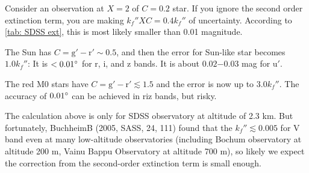 

\begin{ex}
Consider an observation at $ X = 2 $ of $ C = 0.2 $ star. If you ignore the second order extinction term, you are making $ k_f'' XC = 0.4 k_f'' $ of uncertainty. According to \cref{tab: SDSS ext}, this is most likely smaller than 0.01 magnitude. 

The Sun has $ C = \mathrm{g' - r'} \sim 0.5 $, and then the error for Sun-like star becomes $ 1.0 k_f'' $: It is $ < \m{0.01} $ for r, i, and z bands. It is about $ 0.02\mathrm{-}0.03 $ mag for $ \mathrm{u}' $.

The red M0 stars have $ C = \mathrm{g' - r'} \lesssim 1.5 $ and the error is now up to $ 3.0 k_f'' $. The accuracy of $ \m{0.01} $ can be achieved in riz bands, but risky.
\end{ex}

The calculation above is only for SDSS observatory at altitude of 2.3 km. But fortunately, BuchheimB (2005, SASS, 24, 111) found that the $ k_f'' \lesssim 0.005 $ for V band even at many low-altitude observatories (including Bochum observatory at altitude 200 m, Vainu Bappu Observatory at altitude 700 m), so likely we expect the correction from the second-order extinction term is small enough.


